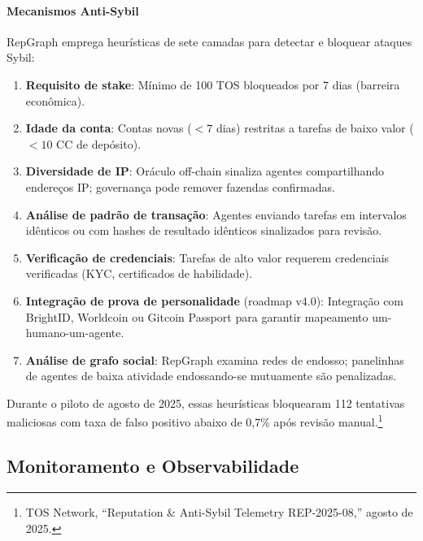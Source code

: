 \documentclass[11pt]{article}
\begin{document}
\paragraph{Mecanismos Anti-Sybil} RepGraph emprega heurísticas de sete camadas para detectar e bloquear ataques Sybil:
\begin{enumerate}[noitemsep]
  \item \textbf{Requisito de stake}: Mínimo de 100 TOS bloqueados por 7 dias (barreira econômica).
  \item \textbf{Idade da conta}: Contas novas ($<7$ dias) restritas a tarefas de baixo valor ($<10$ CC de depósito).
  \item \textbf{Diversidade de IP}: Oráculo off-chain sinaliza agentes compartilhando endereços IP; governança pode remover fazendas confirmadas.
  \item \textbf{Análise de padrão de transação}: Agentes enviando tarefas em intervalos idênticos ou com hashes de resultado idênticos sinalizados para revisão.
  \item \textbf{Verificação de credenciais}: Tarefas de alto valor requerem credenciais verificadas (KYC, certificados de habilidade).
  \item \textbf{Integração de prova de personalidade} (roadmap v4.0): Integração com BrightID, Worldcoin ou Gitcoin Passport para garantir mapeamento um-humano-um-agente.
  \item \textbf{Análise de grafo social}: RepGraph examina redes de endosso; panelinhas de agentes de baixa atividade endossando-se mutuamente são penalizadas.
\end{enumerate}
Durante o piloto de agosto de 2025, essas heurísticas bloquearam 112 tentativas maliciosas com taxa de falso positivo abaixo de 0,7\% após revisão manual.\footnote{TOS Network, ``Reputation \& Anti-Sybil Telemetry REP-2025-08,'' agosto de 2025.}

\subsection{Monitoramento e Observabilidade}
\end{document}
